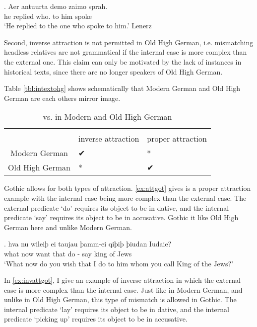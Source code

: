 \exg. Aer antuurta demo zaimo sprah.\\
he replied who. {to him} spoke\\
`He replied to the one who spoke to him.' \hfill Lenerz \label{ex:attohg}

Second, inverse attraction is not permitted in Old High German, i.e. mismatching headless relatives are not grammatical if the internal case is more complex than the external one. This claim can only be motivated by the lack of instances in historical texts, since there are no longer speakers of Old High German.

Table \ref{tbl:intextohg} shows schematically that Modern German and Old High German are each others mirror image.

\begin{table}[h]
	\center
	\caption { vs.  in Modern and Old High German}
	\begin{minipage}{\linewidth}
		\begin{tabularx}{\textwidth}{c *{2}{Y}}
		\toprule
		 								& 				& 				\\
										& inverse attraction	& proper attraction		\\
		\midrule
		Modern German 	& ✔			 							&	*										\\
		Old High German	& *										&	✔										\\
		\bottomrule
		\end{tabularx}
	\end{minipage}
\end{table}\label{tbl:intextohg}

Gothic allows for both types of attraction. \ref{ex:attgot} gives is a proper attraction example with the internal case being more complex than the external case. The external predicate  `do' requires its object to be in dative, and the internal predicate  `say' requires its object to be in accusative. Gothic it like Old High German here and unlike Modern German.

\exg. hva nu wileiþ ei taujau þamm-ei qiþiþ þiudan Iudaie?\\
what now want that do - say king {of Jews}\\
`What now do you wish that I do to him whom you call King of the Jews?' \hfill \citep[339,434]{harbert1978}\label{ex:attgot}

In \ref{ex:invattgot}, I give an example of inverse attraction in which the external case is more complex than the internal case. Just like in Modern German, and unlike in Old High German, this type of mismatch is allowed in Gothic. The internal predicate  `lay' requires its object to be in dative, and the internal predicate  `picking up' requires its object to be in accusative.

